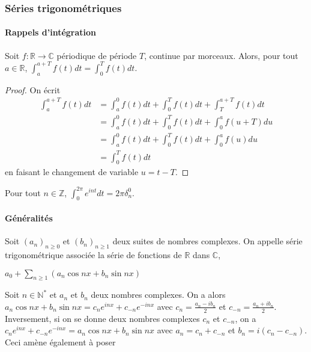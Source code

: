 

\subsubsection{Séries trigonométriques}

\paragraph{Rappels d'intégration}

\begin{lem}
Soit $f : \mathbb{R} \rightarrow \mathbb{C}$ périodique de période $T$, continue par
morceaux. Alors, pour tout $a \in \mathbb{R}$, $\int_a^{a+T} f(t) dt = \int_0^T f(t) dt$.
\end{lem}

\begin{proof}
On écrit 
\begin{align*}
\int_a^{a+T} f(t) dt &= \int_a^0 f(t) dt + \int_0^T f(t) dt + \int_T^{a+T} f(t) dt \\
&= \int_a^0 f(t) dt + \int_0^T f(t) dt + \int_0^a f(u+T) du \\
&= \int_a^0 f(t) dt + \int_0^T f(t) dt + \int_0^a f(u) du \\
&= \int_0^T f(t) dt
\end{align*}
en faisant le changement de variable $u = t - T$.
\end{proof}

\begin{lem}
Pour tout $n \in \mathbb{Z}$, $\int_0^{2\pi} e^{int} dt = 2\pi \delta_n^0$.
\end{lem}

\paragraph{Généralités}

\begin{de}
Soit $(a_n)_{n \geq 0}$ et
$(b_n)_{n \geq 1}$ deux suites de nombres complexes. On appelle
série trigonométrique associée la série de fonctions de $\mathbb{R}$ dans $\mathbb{C}$,

$a_0 + \sum_{n \geq 1} (a_n \cos nx + b_n \sin nx)$
\end{de}

\begin{rem}
Soit $n \in \mathbb{N}^*$ et $a_n$ et $b_n$
deux nombres complexes. On a alors 
$a_n \cos nx + b_n \sin nx = c_n e^{inx} + c_{-n} e^{-inx}$ 
avec
$c_n = \frac{a_n - ib_n}{2}$ et
$c_{-n} = \frac{a_n + ib_n}{2}$.
Inversement, si on se donne deux nombres complexes $c_n$ et
$c_{-n}$, on a $c_n e^{inx} + c_{-n} e^{-inx} = a_n \cos nx + b_n \sin nx$ avec
$a_n = c_n + c_{-n}$ et $b_n = i(c_n - c_{-n})$. Ceci amène également à poser
\end{rem}

